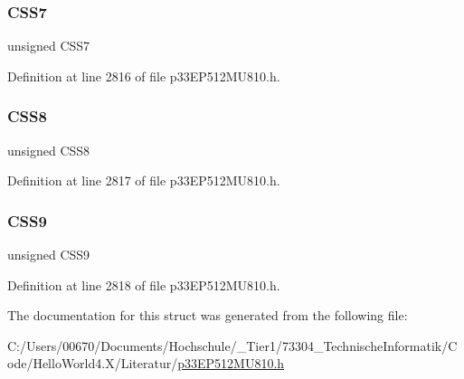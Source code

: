 \subsubsection{\texorpdfstring{C\+S\+S7}{CSS7}}
{\footnotesize\ttfamily unsigned C\+S\+S7}



Definition at line 2816 of file p33\+E\+P512\+M\+U810.\+h.

\mbox{\label{structtag_a_d2_c_s_s_l_b_i_t_s_a867408da1e20ee0ab6e6d649393df325}} 
\subsubsection{\texorpdfstring{C\+S\+S8}{CSS8}}
{\footnotesize\ttfamily unsigned C\+S\+S8}



Definition at line 2817 of file p33\+E\+P512\+M\+U810.\+h.

\mbox{\label{structtag_a_d2_c_s_s_l_b_i_t_s_a17176813a1966557c22aa21e3d2df8d8}} 
\subsubsection{\texorpdfstring{C\+S\+S9}{CSS9}}
{\footnotesize\ttfamily unsigned C\+S\+S9}



Definition at line 2818 of file p33\+E\+P512\+M\+U810.\+h.



The documentation for this struct was generated from the following file\+:\begin{DoxyCompactItemize}
\item 
C\+:/\+Users/00670/\+Documents/\+Hochschule/\+\_\+\+Tier1/73304\+\_\+\+Technische\+Informatik/\+Code/\+Hello\+World4.\+X/\+Literatur/\hyperlink{p33_e_p512_m_u810_8h}{p33\+E\+P512\+M\+U810.\+h}\end{DoxyCompactItemize}
